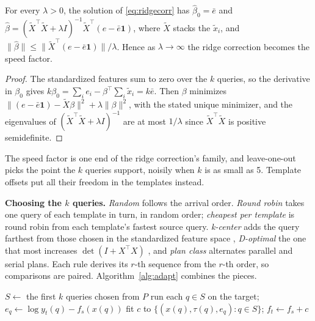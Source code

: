 \documentclass{article}
\begin{document}
\begin{proposition}\label{prop:limit}
For every $\lambda>0$, the solution of \eqref{eq:ridgecorr} has $\hat\beta_0=\bar e$ and $\hat\beta=(\tilde X^\top\tilde X+\lambda I)^{-1}\tilde X^\top(e-\bar e\mathbf 1)$, where $\tilde X$ stacks the $\tilde x_i$, and $\|\hat\beta\|\le\|\tilde X^\top(e-\bar e\mathbf 1)\|/\lambda$. Hence as $\lambda\to\infty$ the ridge correction becomes the speed factor.
\end{proposition}
\begin{proof}
The standardized features sum to zero over the $k$ queries, so the derivative in $\beta_0$ gives $k\beta_0=\sum_i e_i-\beta^\top\sum_i\tilde x_i=k\bar e$. Then $\beta$ minimizes $\|(e-\bar e\mathbf 1)-\tilde X\beta\|^2+\lambda\|\beta\|^2$, with the stated unique minimizer, and the eigenvalues of $(\tilde X^\top\tilde X+\lambda I)^{-1}$ are at most $1/\lambda$ since $\tilde X^\top\tilde X$ is positive semidefinite.
\end{proof}
The speed factor is one end of the ridge correction's family, and leave-one-out picks the point the $k$ queries support, noisily when $k$ is as small as 5. Template offsets put all their freedom in the templates instead.

\textbf{Choosing the $k$ queries.} \emph{Random} follows the arrival order. \emph{Round robin} takes one query of each template in turn, in random order; \emph{cheapest per template} is round robin from each template's fastest source query. \emph{k-center} adds the query farthest from those chosen in the standardized feature space \parencite{gonzalez1985,sener2018}, \emph{D-optimal} the one that most increases $\det(I+X^\top X)$ \parencite{wynn1970,mitchell1974}, and \emph{plan class} alternates parallel and serial plans. Each rule derives its $r$-th sequence from the $r$-th order, so comparisons are paired. Algorithm~\ref{alg:adapt} combines the pieces.

\begin{algorithm}[t]
\small
\DontPrintSemicolon
{}
$S\gets$ the first $k$ queries chosen from $P$ 
run each $q\in S$ on the target; $e_q\gets\log y_t(q)-f_s(x(q))$\;
fit $c$ to $\{(x(q),\tau(q),e_q):q\in S\}$; $f_t\gets f_s+c$ 
\caption{Adapting a source model with measured target queries and continuing to learn}
\label{alg:adapt}
\end{algorithm}
\end{document}
